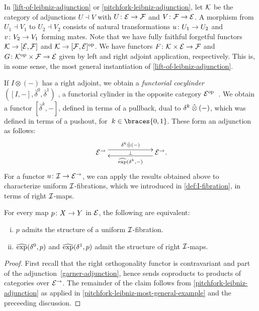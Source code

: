 \documentclass[reqno,10pt,a4paper,oneside]{amsart}
\begin{document}
\begin{remark} \label{pitchfork-leibniz-most-general-example}
In \cref{lift-of-leibniz-adjunction} or \cref{pitchfork-leibniz-adjunction}, let $\cal{K}$ be the category of adjunctions $U \dashv V$ with $U \co \cal{E} \to \cal{F}$ and $V \co \cal{F} \to \cal{E}$.
A morphism from $U_1 \dashv V_1$ to $U_2 \dashv V_2$ consists of natural transformations $u \co U_1 \to U_2$ and $v \co V_2 \to V_1$ forming mates.
Note that we have fully faithful forgetful functors $\cal{K} \to [\cal{E}, \cal{F}]$ and $\cal{K} \to [\cal{F}, \cal{E}]^{\op}$.
We have functors $F \co \cal{K} \times \cal{E} \to \cal{F}$ and $G \co \cal{K}^{\op} \times \cal{F} \to \cal{E}$ given by left and right adjoint application, respectively.
This is, in some sense, the most general instantiation of \cref{lift-of-leibniz-adjunction}.
\end{remark}

\medskip


If $I \otimes (-)$ has a right adjoint, we obtain a \emph{functorial cocylinder} $([I, -], \bar{\delta}^0, \bar{\delta}^1)$ , \ie a functorial cylinder in the opposite category $\catE^{\op}$~\cite{kamps-porter:homotopy}.
We obtain a functor $[\bar{\delta}^k, -]$, defined in terms of a pullback, dual to $\kcyl \hatotimes (-)$, which was defined in terms of a pushout, for~$k \in \braces{0, 1}$.
These form an adjunction as follows:
\[
\xymatrix@C+4em{
  \cal{E}^\to \ar@<1ex>[r]^{\kcyl \hatotimes (-)} \ar@{}[r]|{\bot} &
  \cal{E}^\to \rlap{.} \ar@<1ex>[l]^{\hatexp(\kcyl, -)}
}
\]
For a functor $u \co \cal{I} \to \cal{E}^\to$, we can apply the results obtained above to characterize uniform $\cal{I}$-fibrations, which we introduced in \cref{def:I-fibration}, in terms of right $\cal{I}$-maps.



\begin{proposition} \label{prod-exp-general}
For every map $p \co X \to Y$ in $\cal{E}$, the following are equivalent:
\begin{enumerate}[(i)]
\item $p$ admits the structure of a uniform $\cal{I}$-fibration.
\item $\hatexp(\lcyl, p)$ and $\hatexp(\rcyl, p)$ admit the structure of right $\cal{I}$-maps.
\end{enumerate}
\end{proposition}

\begin{proof}
First recall that the right orthogonality functor is contravariant and part of the adjunction~\eqref{garner-adjunction}, hence sends coproducts to products of categories over $\cal{E}^\to$.
The remainder of the claim follows from \cref{pitchfork-leibniz-adjunction} as applied in \cref{pitchfork-leibniz-most-general-example} and the preceeding discussion.
\end{proof}
\end{document}
